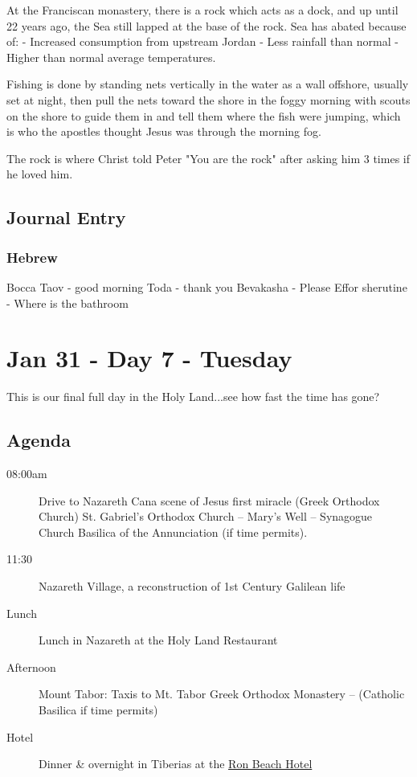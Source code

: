 \documentclass[letterpaper]{report}
\begin{document}
At the Franciscan monastery, there is a rock which acts as a dock, and up until 22 years ago, the Sea still lapped at the base of the rock.
Sea has abated because of:
- Increased consumption from upstream Jordan
- Less rainfall than normal
- Higher than normal average temperatures.

Fishing is done by standing nets vertically in the water as a wall offshore, usually set at night, then pull the nets toward the shore in the foggy morning with scouts on the shore to guide them in and tell them where the fish were jumping, which is who the apostles thought Jesus was through the morning fog.

The rock is where Christ told Peter "You are the rock" after asking him 3 times if he loved him.

\clearpage
\section{Journal Entry}
\subsection{Hebrew}
Bocca Taov - good morning
Toda - thank you
Bevakasha - Please
Effor sherutine - Where is the bathroom


\clearpage
\chapter{Jan 31 - Day 7 - Tuesday}
This is our final full day in the Holy Land...see how fast the time has gone?

\section{Agenda}
\begin{description}
	\item[08:00am] Drive to Nazareth Cana
	  \subitem scene of Jesus first miracle (Greek Orthodox Church)
	  \subitem St. Gabriel’s Orthodox Church – Mary’s Well – Synagogue Church 
	  \subitem Basilica of the Annunciation (if time permits).
	\item[11:30] Nazareth Village,
	    a reconstruction of 1st Century Galilean life
	\item[Lunch] Lunch in Nazareth at the Holy Land Restaurant
	\item[Afternoon] Mount Tabor: Taxis to Mt. Tabor 
	    \subitem Greek Orthodox Monastery – (Catholic Basilica if time permits)
	\item[Hotel] Dinner \& overnight in Tiberias at the   
	  \href{http://www.ronbeachhotel.com/}{Ron Beach Hotel}
\end{description}
\end{document}
